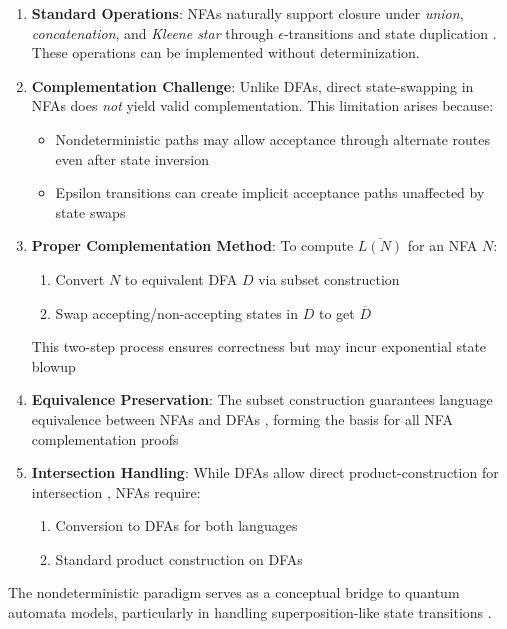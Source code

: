 \begin{enumerate}
    \item \textbf{Standard Operations}: 
    NFAs naturally support closure under \textit{union}, \textit{concatenation}, and \textit{Kleene star} through $\epsilon$-transitions and state duplication \cite{GeeksforGeeksDFA2024}. These operations can be implemented without determinization.
    
    \item \textbf{Complementation Challenge}: 
    Unlike DFAs, direct state-swapping in NFAs does \textit{not} yield valid complementation. This limitation arises because:
    \begin{itemize}
        \item Nondeterministic paths may allow acceptance through alternate routes even after state inversion \cite{rabin1963probabilistic}
        \item Epsilon transitions can create implicit acceptance paths unaffected by state swaps \cite{hopcroft2006introduction}
    \end{itemize}
    
    \item \textbf{Proper Complementation Method}:
    To compute $\overline{L(N)}$ for an NFA $N$:
    \begin{enumerate}
        \item Convert $N$ to equivalent DFA $D$ via subset construction \cite{hopcroft2006introduction}
        \item Swap accepting/non-accepting states in $D$ to get $\overline{D}$ \cite{GeeksforGeeksDFA2024}
    \end{enumerate}
    This two-step process ensures correctness but may incur exponential state blowup \cite{bianchi2014size}
    
    \item \textbf{Equivalence Preservation}:
    The subset construction guarantees language equivalence between NFAs and DFAs \cite{hopcroft2006introduction}, forming the basis for all NFA complementation proofs
    
    \item \textbf{Intersection Handling}:
    While DFAs allow direct product-construction for intersection \cite{hopcroft2006introduction}, NFAs require:
    \begin{enumerate}
        \item Conversion to DFAs for both languages
        \item Standard product construction on DFAs
    \end{enumerate}
\end{enumerate}

The nondeterministic paradigm serves as a conceptual bridge to quantum automata models, particularly in handling superposition-like state transitions \cite{ambainis2009superiority}.